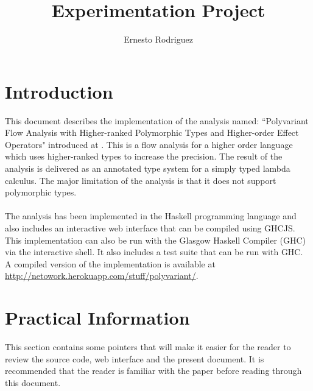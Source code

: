 \documentclass[8pt]{extarticle}
\title{Experimentation Project}
\author{Ernesto Rodriguez}
\begin{document}
\maketitle
\section{Introduction}
This document describes the implementation of the analysis named: ``Polyvariant Flow Analysis with Higher-ranked Polymorphic Types and Higher-order Effect Operators" introduced at \cite{analysis}. This is a flow analysis for a higher order language which uses higher-ranked types to increase the precision. The result of the analysis is delivered as an annotated type system for a simply typed lambda calculus. The major limitation of the analysis is that it does not support polymorphic types.
\\\\
The analysis has been implemented in the Haskell programming language and also includes an interactive web interface that can be compiled using GHCJS\cite{GHCJS}. This implementation can also be run with the Glasgow Haskell Compiler (GHC) via the interactive shell. It also includes a test suite that can be run with GHC. A compiled version of the implementation is available at \url{http://netowork.herokuapp.com/stuff/polyvariant/}.
\section{Practical Information}
This section contains some pointers that will make it easier for the reader to review the source code, web interface and the present document. It is recommended that the reader is familiar with the paper \cite{analysis} before reading through this document.
\end{document}
